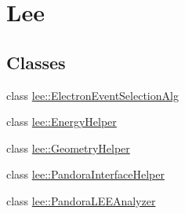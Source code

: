 \hypertarget{group__lee}{\section{Lee}
\label{group__lee}
}
\subsection*{Classes}
\begin{DoxyCompactItemize}
\item 
class \hyperlink{classlee_1_1ElectronEventSelectionAlg}{lee\-::\-Electron\-Event\-Selection\-Alg}
\item 
class \hyperlink{classlee_1_1EnergyHelper}{lee\-::\-Energy\-Helper}
\item 
class \hyperlink{classlee_1_1GeometryHelper}{lee\-::\-Geometry\-Helper}
\item 
class \hyperlink{classlee_1_1PandoraInterfaceHelper}{lee\-::\-Pandora\-Interface\-Helper}
\item 
class \hyperlink{classlee_1_1PandoraLEEAnalyzer}{lee\-::\-Pandora\-L\-E\-E\-Analyzer}
\end{DoxyCompactItemize}
